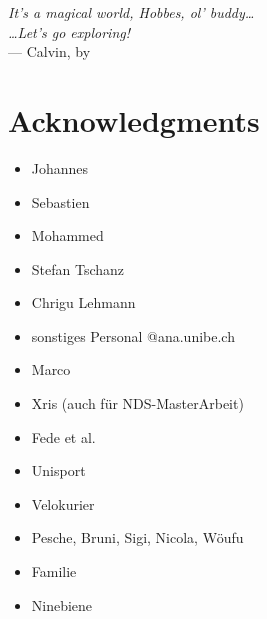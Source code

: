 
\begin{flushright}{\slshape    
		It's a magical world, Hobbes, ol' buddy\dots\\
		\dots Let's go exploring!}\\ \medskip
		--- Calvin, by \citep{Watterson1996}
\end{flushright}

\vfill

\bigskip
\begingroup
\let\clearpage\relax
\let\cleardoublepage\relax
\let\cleardoublepage\relax
\chapter*{Acknowledgments}
\begin{itemize}
	\item Johannes
	\item Sebastien
	\item Mohammed
	\item Stefan Tschanz
	\item Chrigu Lehmann
	\item sonstiges Personal @ana.unibe.ch
\end{itemize}
\bigskip
\begin{itemize}
	\item Marco
	\item Xris (auch für NDS-MasterArbeit)
	\item Fede et al.
\end{itemize}
\bigskip
\begin{itemize}
	\item Unisport
	\item Velokurier
\end{itemize}
\bigskip
\begin{itemize}
	\item Pesche, Bruni, Sigi, Nicola, Wöufu
	\item Familie
	\item Ninebiene
\end{itemize}

\endgroup